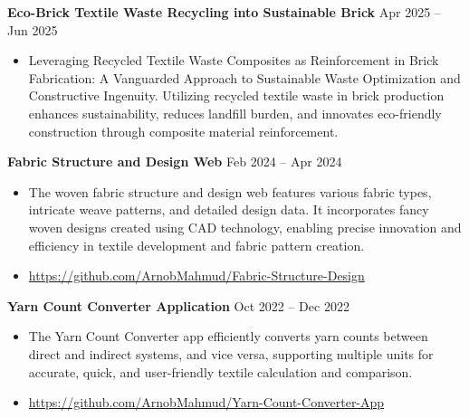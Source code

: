 

{\textbf{Eco-Brick \textbar{} Textile Waste Recycling into Sustainable Brick}} \hfill Apr 2025 – Jun 2025\\

\begin{itemize}
	\item
	      \vspace{-2mm}
	      \begin{justify}Leveraging Recycled Textile Waste Composites as Reinforcement in Brick Fabrication: A Vanguarded Approach to Sustainable Waste Optimization and Constructive Ingenuity. Utilizing recycled textile waste in brick production enhances sustainability, reduces landfill burden, and innovates eco-friendly construction through composite material reinforcement.
	      \end{justify}
\end{itemize}

{\textbf{Fabric Structure and Design Web}} \hfill  Feb 2024 – Apr 2024\\
\begin{itemize}
	\vspace{-2mm}
	\item
	      \begin{justify}The woven fabric structure and design web features various fabric types, intricate weave patterns, and detailed design data. It incorporates fancy woven designs created using CAD technology, enabling precise innovation and efficiency in textile development and fabric pattern creation.
	      \end{justify}
	      \vspace{-2mm}
	\item \href{https://github.com/ArnobMahmud/Fabric-Structure-Design}{https://github.com/ArnobMahmud/Fabric-Structure-Design}

\end{itemize}

{\textbf{Yarn Count Converter Application}} \hfill Oct 2022 – Dec 2022\\
\begin{itemize}
	\item
	      \vspace{-2mm}
	      \begin{justify}The Yarn Count Converter app efficiently converts yarn counts between direct and indirect systems,
		      and vice versa, supporting multiple units for accurate, quick, and user-friendly textile calculation and comparison.
	      \end{justify}
	\item
	      \vspace{-2mm}
	      \href{https://github.com/ArnobMahmud/Yarn-Count-Converter-App}{https://github.com/ArnobMahmud/Yarn-Count-Converter-App}

\end{itemize}
